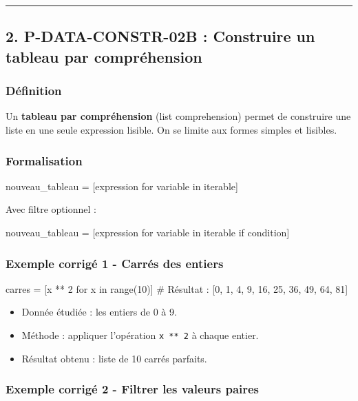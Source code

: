 \begin{center}\rule{0.5\linewidth}{0.5pt}\end{center}

\subsection{2. P-DATA-CONSTR-02B : Construire un tableau par compréhension}

\subsubsection{Définition}

Un \textbf{tableau par compréhension} (list comprehension) permet de
construire une liste en une seule expression lisible. On se limite aux
formes simples et lisibles.

\subsubsection{Formalisation}

\begin{python}
nouveau_tableau = [expression for variable in iterable]
\end{python}

Avec filtre optionnel :

\begin{python}
nouveau_tableau = [expression for variable in iterable if condition]
\end{python}

\subsubsection{Exemple corrigé 1 - Carrés des entiers}

\begin{python}
carres = [x ** 2 for x in range(10)]
# Résultat : [0, 1, 4, 9, 16, 25, 36, 49, 64, 81]
\end{python}

\begin{itemize}
\tightlist
\item
  Donnée étudiée : les entiers de 0 à 9.
\item
  Méthode : appliquer l'opération \texttt{x\ **\ 2} à chaque entier.
\item
  Résultat obtenu : liste de 10 carrés parfaits.
\end{itemize}

\subsubsection{Exemple corrigé 2 - Filtrer les valeurs paires}

